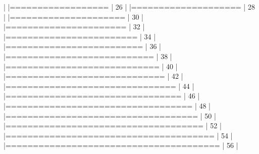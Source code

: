 \documentclass{article}
\begin{document}
\begin{Schunk}
\begin{Soutput}
  |                                                                            
  |==================                                                    |  26%
  |                                                                            
  |====================                                                  |  28%
  |                                                                            
  |=====================                                                 |  30%
  |                                                                            
  |======================                                                |  32%
  |                                                                            
  |========================                                              |  34%
  |                                                                            
  |=========================                                             |  36%
  |                                                                            
  |===========================                                           |  38%
  |                                                                            
  |============================                                          |  40%
  |                                                                            
  |=============================                                         |  42%
  |                                                                            
  |===============================                                       |  44%
  |                                                                            
  |================================                                      |  46%
  |                                                                            
  |==================================                                    |  48%
  |                                                                            
  |===================================                                   |  50%
  |                                                                            
  |====================================                                  |  52%
  |                                                                            
  |======================================                                |  54%
  |                                                                            
  |=======================================                               |  56%
  |                                                                            

\end{Soutput}
\end{Schunk}
\end{document}
